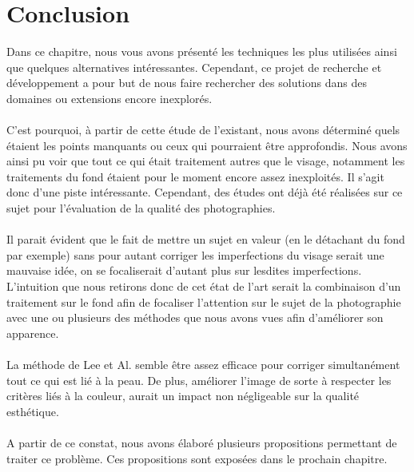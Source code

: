 \documentclass[11pt, french,screen]{report-rd-info}
\begin{document}
\section{Conclusion}
Dans ce chapitre, nous vous avons présenté les techniques les plus utilisées ainsi que quelques alternatives intéressantes. Cependant, ce projet de recherche et développement a pour but de nous faire rechercher des solutions dans des domaines ou extensions encore inexplorés.
\paragraph*{}
C’est pourquoi, à partir de cette étude de l’existant, nous avons déterminé quels étaient les points manquants ou ceux qui pourraient être approfondis. Nous avons ainsi pu voir que tout ce qui était traitement autres que le visage, notamment les traitements du fond étaient pour le moment encore assez inexploités. Il s’agit donc d’une piste intéressante. Cependant, des études ont déjà été réalisées sur ce sujet pour l’évaluation de la qualité des photographies.
\paragraph*{}
Il parait évident que le fait de mettre un sujet en valeur (en le détachant du fond par exemple) sans pour autant corriger les imperfections du visage serait une mauvaise idée, on se focaliserait d’autant plus sur lesdites imperfections. L’intuition que nous retirons donc de cet état de l’art serait la combinaison d’un traitement sur le fond afin de focaliser l’attention sur le sujet de la photographie avec une ou plusieurs des méthodes que nous avons vues afin d’améliorer son apparence. 
\paragraph*{}
La méthode de Lee et Al.\cite{Lee} semble être assez efficace pour corriger simultanément tout ce qui est lié à la peau. De plus, améliorer l'image de sorte à respecter les critères liés à la couleur, aurait un impact non négligeable sur la qualité esthétique. 
\paragraph*{}
A partir de ce constat, nous avons élaboré plusieurs propositions permettant de traiter ce problème. Ces propositions sont exposées dans le prochain chapitre.
\end{document}

